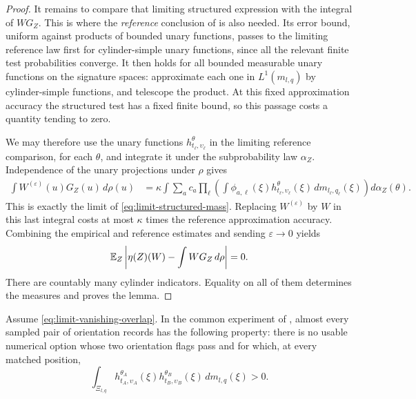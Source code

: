 \begin{proof}
It remains to compare that limiting structured expression with the
integral of $W G_Z$. This is where the \emph{reference} conclusion of
 is also needed. Its error bound, uniform against
products of bounded unary functions, passes to the limiting reference
law first for cylinder-simple unary functions, since all the relevant
finite test probabilities converge. It then holds for all bounded
measurable unary functions on the signature spaces: approximate each
one in $L^1(m_{l,q})$ by cylinder-simple functions, and telescope the
product. At this fixed approximation accuracy the structured test has
a fixed finite bound, so this passage costs a quantity tending to zero.

We may therefore use the unary functions
$h^\theta_{t_\ell,\upsilon_\ell}$ in the limiting reference comparison, for
each $\theta$, and integrate it under the subprobability law
$\alpha_Z$. Independence of the unary projections under $\rho$ gives
\begin{align*}
\int W^{(\varepsilon)}(u)G_Z(u)\,d\rho(u)
&=\kappa\int\sum_a c_a
 \prod_\ell\left(
   \int\phi_{a,\ell}(\xi)
                h^\theta_{t_\ell,\upsilon_\ell}(\xi)\,dm_{l_\ell,q_\ell}(\xi)
              \right)d\alpha_Z(\theta).
\end{align*}
This is exactly the limit of \eqref{eq:limit-structured-mass}.
Replacing $W^{(\varepsilon)}$ by $W$ in this last integral costs at most
$\kappa$ times the reference approximation accuracy. Combining the
empirical and reference estimates and sending $\varepsilon\to0$ yields
\[
\mathbb E_Z\left|\eta(Z)(W)-\int W G_Z\,d\rho\right|=0.
\]
There are countably many cylinder indicators. Equality on all of them
determines the measures and proves the lemma.
\end{proof}

\begin{proposition}
\label{prop:limit-overlap}
Assume \eqref{eq:limit-vanishing-overlap}. In the common experiment of
, almost every sampled pair of orientation records
has the following property: there is no usable numerical option whose
two orientation flags pass and for which, at every matched position,
\begin{equation}
\label{eq:limit-positive-generator}
\int_{\Xi_{l,q}}
 h^{\theta_A}_{t_A,\upsilon_A}(\xi)
 h^{\theta_B}_{t_B,\upsilon_B}(\xi)\,dm_{l,q}(\xi)>0.
\end{equation}
\end{proposition}

